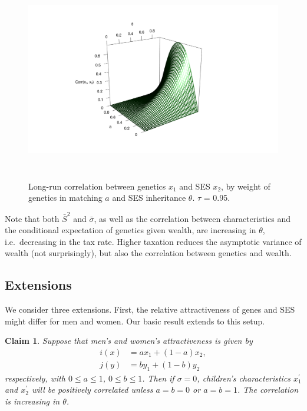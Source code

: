 \documentclass[
]{article}
\newtheorem{claim}{Claim}
\theoremstyle{definition}
\theoremstyle{definition}
\theoremstyle{definition}
\theoremstyle{definition}
\theoremstyle{remark}
\begin{document}
\begin{figure}

{\centering \includegraphics[height=3.5in]{trading-genetics_files/figure-latex/pic-asymptotic-corr-1-rgl} 

}

\caption{Long-run correlation between genetics $x_1$ and SES $x_2$, by weight of genetics in matching $a$ and SES inheritance $\theta$. $\tau$ = 0.95.}\label{fig:pic-asymptotic-corr}
\end{figure}

Note that both \(\bar{S}^{2}\) and \(\bar{\sigma}\), as well as the correlation
between characteristics and the conditional expectation of genetics given
wealth, are increasing in \(\theta\), i.e.~decreasing in the tax rate. Higher
taxation reduces the asymptotic variance of wealth (not surprisingly), but
also the correlation between genetics and wealth.

\hypertarget{extensions}{%
\subsection{Extensions}\label{extensions}}

We consider three extensions. First, the relative attractiveness of genes and
SES might differ for men and women. Our basic result extends to this setup.

\begin{claim}\label{claim-men-women-different}
Suppose that men's and women's attractiveness is given by
\begin{align*}
i(x) &= ax_1 + (1-a)x_2, \\
j(y) &= by_1 + (1-b)y_2
\end{align*}
respectively, with $0\le a \le 1$, $0 \le b \le 1$. Then if $\sigma = 0$, children's 
characteristics $x^\prime_1$ and $x^\prime_2$ will be positively correlated 
unless $a = b = 0$ or $a = b = 1$. The correlation is increasing in $\theta$.

\end{claim}
\end{document}
